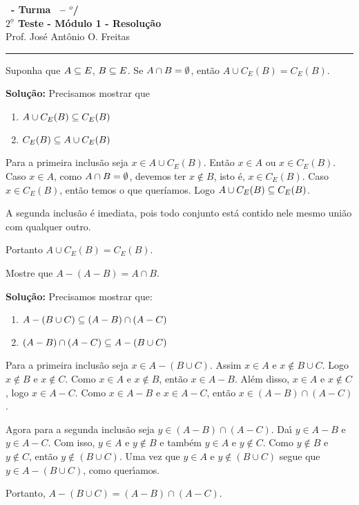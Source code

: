 \documentclass[12pt]{exam}
\begin{document}
\begin{center}
{\Large\bf \disciplina\ - Turma \turma\ -- \semestre$^{o}$/\ano} \\ \vspace{9pt} {\large\bf
$2^{\underline{o}}$ Teste - M\'odulo 1 - Resolu\c{c}\~ao}\\
\vspace{9pt} Prof. Jos{\'e} Ant{\^o}nio O. Freitas
\end{center}
\hrule

\vspace{.6cm}

\questao Suponha que $A \subseteq E$, $B \subseteq E$. Se $A \cap B = \emptyset$, então $A \cup C_E(B) = C_E(B)$.

\noindent\textbf{Solu\c{c}\~ao:} Precisamos mostrar que
\begin{enumerate}[label={\roman*})]
    \item $A \cup C_E(B) \subseteq C_E(B)$
    \item $C_E(B) \subseteq A \cup C_E(B)$
\end{enumerate}

Para a primeira inclusão seja $x \in A \cup C_E(B)$. Então $x \in A$ ou $x \in C_E(B)$. Caso $x \in A$, como $A \cap B = \emptyset$, devemos ter $x \notin B$, isto é, $x \in C_E(B)$. Caso $x \in C_E(B)$, então temos o que queríamos. Logo $A \cup C_E(B) \subseteq C_E(B)$.

A segunda inclusão é imediata, pois todo conjunto está contido nele mesmo união com qualquer outro.

Portanto $A \cup C_E(B) = C_E(B)$.

\vspace{.5cm}

\questao Mostre que $A - (A - B) = A \cap B$.

\noindent\textbf{Solu\c{c}\~ao:} Precisamos mostrar que:
\begin{enumerate}[label={\roman*})]
	\item $A - (B \cup C) \subseteq (A - B) \cap (A - C)$
	\item $(A - B) \cap (A - C) \subseteq A - (B \cup C)$
\end{enumerate}

Para a primeira inclus\~ao seja $x \in A - (B \cup C)$. Assim $x \in A$ e $x \notin B \cup C$. Logo $x \notin B$ e $x \notin C$. Como $x \in A$ e $x \notin B$, ent\~ao $x \in A - B$. Al\'em disso, $x \in A$ e $x \notin C$, logo $x \in A - C$. Como $x \in A - B$ e $x \in A - C$, ent\~ao $x \in (A - B) \cap (A - C)$.

Agora para a segunda inclus\~ao seja $y \in (A - B) \cap (A - C)$. Da{\'\i} $y \in A - B$ e $y \in A - C$. Com isso, $y \in A$ e $y \notin B$ e tamb\'em $y \in A$ e $y \notin C$. Como $y \notin B$ e $y \notin C$, ent\~ao $y \notin (B \cup C)$. Uma vez que $y \in A$ e $y \notin (B \cup C)$ segue que $y \in A - (B \cup C)$, como quer{\'\i}amos.

Portanto, $A - (B \cup C) = (A - B) \cap (A - C)$.
\end{document}
